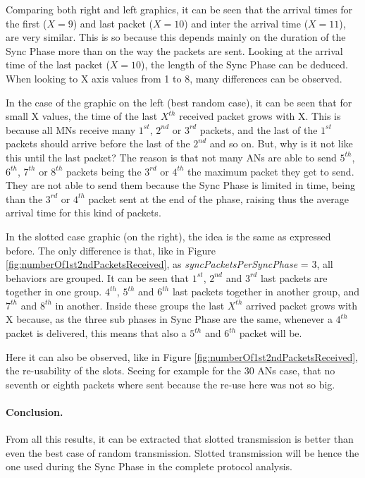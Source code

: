 Comparing both right and left graphics, it can be seen that the arrival times for the first ($X=9$) and last packet ($X=10$) and inter the arrival 
time ($X=11$), are very similar. This is so because this depends mainly on the duration of the Sync Phase more than on the way the packets are sent. 
Looking at the arrival time of the last packet ($X=10$), the length of the Sync Phase can be deduced. When looking to X axis values from 1 to 8, many
differences can be observed.

In the case of the graphic on the left (best random case), it can be seen that for small X values, the time of the last $X^{th}$ received packet 
grows with X. This is because all \acp{MN} receive many $1^{st}$, $2^{nd}$ or $3^{rd}$ packets, and the last of the $1^{st}$ packets should arrive 
before the last of the $2^{nd}$ and so on. But, why is it not like this until the last packet? The reason is that not many \acp{AN} are able to send
$5^{th}$, $6^{th}$, $7^{th}$ or $8^{th}$ packets being the $3^{rd}$ or $4^{th}$ the maximum packet they get to send. They are not able to send them
because the Sync Phase is limited in time, being than the $3^{rd}$ or $4^{th}$ packet sent at the end of the phase, raising thus the average arrival time
for this kind of packets.

In the slotted case graphic (on the right), the idea is the same as expressed before. The only difference is that, like in Figure 
\ref{fig:numberOf1st2ndPacketsReceived}, as \textit{syncPacketsPerSyncPhase} = 3, all behaviors are grouped. It can be seen that $1^{st}$, $2^{nd}$ and 
$3^{rd}$ last packets are together in one group. $4^{th}$, $5^{th}$ and $6^{th}$ last packets together in another group, and $7^{th}$ and $8^{th}$ in
another. Inside these groups the last $X^{th}$ arrived packet grows with X because, as the three sub phases in Sync Phase are the same, whenever a 
$4^{th}$ packet is delivered, this means that also a $5^{th}$ and $6^{th}$ packet will be.

Here it can also be observed, like in Figure \ref{fig:numberOf1st2ndPacketsReceived}, the re-usability of the slots. Seeing for example for the 
30 \acp{AN} case, that no seventh or eighth packets where sent because the re-use here was not so big.

\paragraph{Conclusion.} From all this results, it can be extracted that slotted transmission is better than even the best case of random transmission. 
Slotted transmission will be hence the one used during the Sync Phase in the complete protocol analysis.

